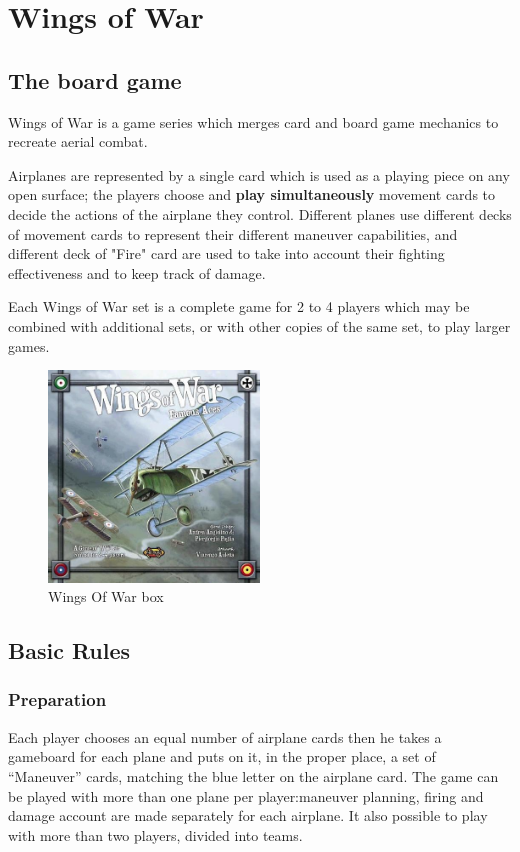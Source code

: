 
\chapter{Wings of War}

\section{The board game}

Wings of War is a game series which merges card and board game mechanics to recreate aerial combat.

Airplanes are represented by a single card which is used as a playing piece on any open surface; the players choose and \textbf{play simultaneously} movement cards to decide the actions of the airplane they control. Different planes use different decks of movement cards to represent their different maneuver capabilities, and different deck of "Fire" card are used to take into account their fighting effectiveness and to keep track of damage.

Each Wings of War set is a complete game for 2 to 4 players which may be combined with additional sets, or with other copies of the same set, to play larger games.

\begin{figure}
  \centering
      \includegraphics[width=0.5\textwidth]{images/wow.jpg}
  \caption{Wings Of War box}
\end{figure}

\section{Basic Rules}
\subsection{Preparation}
Each player chooses an equal number of airplane cards then he takes a gameboard for each plane and puts on it, in the proper place, a set of “Maneuver” cards, matching the blue letter on the airplane card.
The game can be played with more than one plane per player:maneuver planning, firing and damage account are made separately for each airplane. It also possible to play with more than two players, divided into teams.
